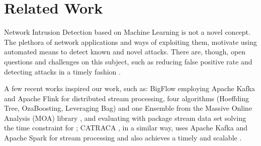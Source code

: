 
\section{Related Work}
\label{sec:related}

Network Intrusion Detection based on Machine Learning is not a novel concept.
The plethora of network applications and 
ways of exploiting them, motivate using automated means to detect known and novel attacks. 
There are, though, open questions and challenges on this subject, such as
reducing false positive rate and detecting attacks in a timely fashion \cite{DaCosta2019a}.

A few recent works inspired our work, such as: BigFlow \cite{Viegas2019}
employing Apache Kafka and Apache Flink for distributed stream processing,
four algorithms (Hoeffding Tree, OzaBoosting, Leveraging Bag) and one Ensemble
from the Massive Online Analysis (MOA) library \cite{MOA}, and
evaluating with package stream data set solving the time constraint for \nids;
CATRACA \cite{AndreoniLopez2018,AndreoniLopez2019}, in a similar way, uses 
Apache Kafka and Apache Spark for stream processing and also achieves
a timely and scalable \nids.


